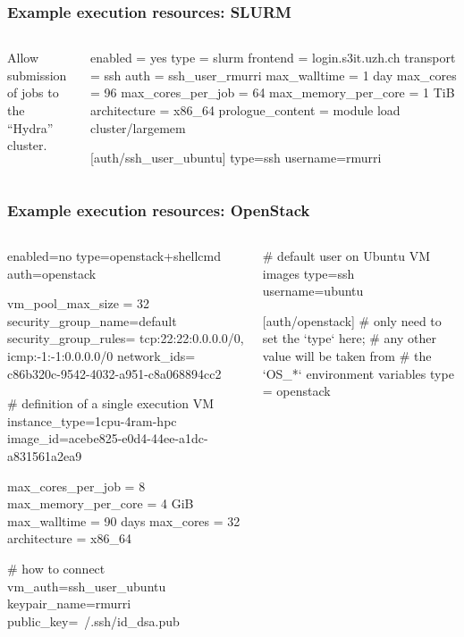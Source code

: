 \documentclass[english,serif,mathserif,usenames,dvipsnames]{beamer}
\begin{document}
\begin{frame}[fragile]
  \frametitle{Example execution resources: SLURM}
  \begin{columns}[t]
    \begin{column}{0.5\textwidth}
      Allow submission of jobs to the ``Hydra'' cluster.
    \end{column}
    \begin{column}{0.5\textwidth}
\begin{stdout}
enabled = yes
type = slurm
frontend = login.s3it.uzh.ch
transport = ssh
auth = ssh_user_rmurri
max_walltime = 1 day
max_cores = 96
max_cores_per_job = 64
max_memory_per_core = 1 TiB
architecture = x86_64
prologue_content =
  module load cluster/largemem

[auth/ssh_user_ubuntu]
type=ssh
username=rmurri
\end{stdout}
    \end{column}
  \end{columns}
\end{frame}


\begin{frame}[fragile]
  \frametitle{Example execution resources: OpenStack}
  \begin{columns}[t]
    \begin{column}{0.5\textwidth}
\begin{stdout}
enabled=no
type=openstack+shellcmd
auth=openstack

vm_pool_max_size = 32
security_group_name=default
security_group_rules=
  tcp:22:22:0.0.0.0/0,
  icmp:-1:-1:0.0.0.0/0
network_ids=
  c86b320c-9542-4032-a951-c8a068894cc2

# definition of a single execution VM
instance_type=1cpu-4ram-hpc
image_id=acebe825-e0d4-44ee-a1dc-a831561a2ea9

max_cores_per_job = 8
max_memory_per_core = 4 GiB
max_walltime = 90 days
max_cores = 32
architecture = x86_64

# how to connect
vm_auth=ssh_user_ubuntu
keypair_name=rmurri
public_key=~/.ssh/id_dsa.pub
\end{stdout}
    \end{column}
    \begin{column}{0.5\textwidth}
      \begin{stdout}
# default user on Ubuntu VM images
type=ssh
username=ubuntu


[auth/openstack]
# only need to set the `type` here;
# any other value will be taken from
# the `OS\_*` environment variables
type = openstack
      \end{stdout}
    \end{column}
  \end{columns}
\end{frame}
\end{document}

